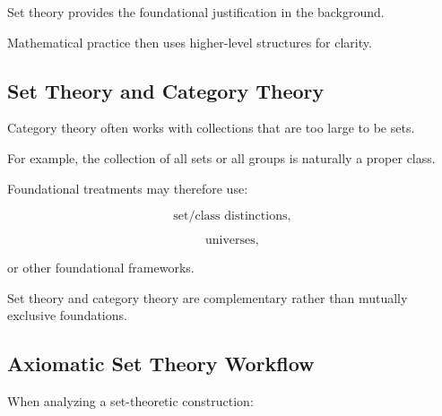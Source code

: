 Set theory provides the foundational justification in the background.

Mathematical practice then uses higher-level structures for clarity.

\subsection{Set Theory and Category Theory}
\label{subsec:set-theory-category-theory}

Category theory often works with collections that are too large to be sets.

For example, the collection of all sets or all groups is naturally a
proper class.

Foundational treatments may therefore use:

\[
\boxed{
\text{set/class distinctions},
}
\]

\[
\boxed{
\text{universes},
}
\]

or other foundational frameworks.

Set theory and category theory are complementary rather than mutually
exclusive foundations.

\subsection{Axiomatic Set Theory Workflow}
\label{subsec:axiomatic-set-theory-workflow}

When analyzing a set-theoretic construction:

